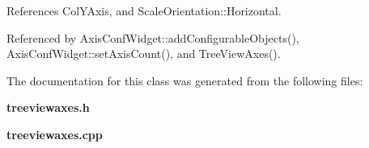 References Col\+Y\+Axis, and Scale\+Orientation\+::\+Horizontal.



Referenced by Axis\+Conf\+Widget\+::add\+Configurable\+Objects(), Axis\+Conf\+Widget\+::set\+Axis\+Count(), and Tree\+View\+Axes().



The documentation for this class was generated from the following files\+:\begin{DoxyCompactItemize}
\item 
{\bf treeviewaxes.\+h}\item 
{\bf treeviewaxes.\+cpp}\end{DoxyCompactItemize}
